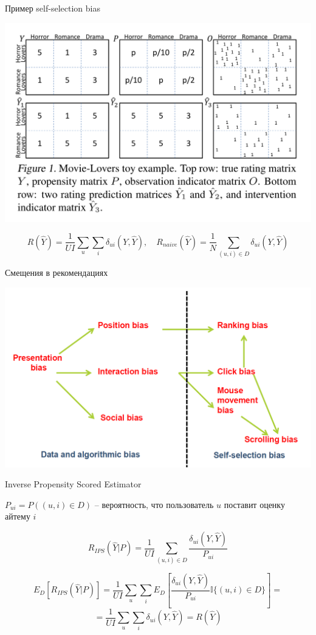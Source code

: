 \documentclass[11pt,aspectratio=169,handout]{beamer}
\begin{document}
\begin{frame}{Пример self-selection bias}

\begin{center}
\includegraphics[scale=0.3]{images/bias-example.png}
\end{center}

\[
R(\hat Y) = \frac{1}{U I} \sum_u \sum_i \delta_{ui} (Y, \hat Y), \quad R_{naive}(\hat Y) = \frac{1}{N} \sum_{(u,i) \in D} \delta_{ui}(Y, \hat Y)
\]

\end{frame}

\begin{frame}{Смещения в рекомендациях \cite{BIAS}}

\begin{center}
\includegraphics[scale=0.2]{images/bias.png}
\end{center}

\end{frame}

\begin{frame}{Inverse Propensity Scored Estimator \cite{TREATMENTS}}

$P_{ui} = P((u, i) \in D)$ -- вероятность, что пользователь $u$ поставит оценку айтему $i$

\[
R_{IPS}(\hat Y | P) = \frac{1}{U I} \sum_{(u,i) \in D} \frac{\delta_{ui}(Y, \hat Y)}{P_{ui}}
\]

\[
E_D [R_{IPS}(\hat Y | P)] = \frac{1}{U I} \sum_u \sum_i E_D\left[ \frac{\delta_{ui}(Y, \hat Y)}{P_{ui}} \mathbb{I}\{(u, i) \in D\}\right] = 
\]
\[
= \frac{1}{U I} \sum_u \sum_i \delta_{ui} (Y, \hat Y) = R(\hat Y) 
\]

\end{frame}
\end{document}
